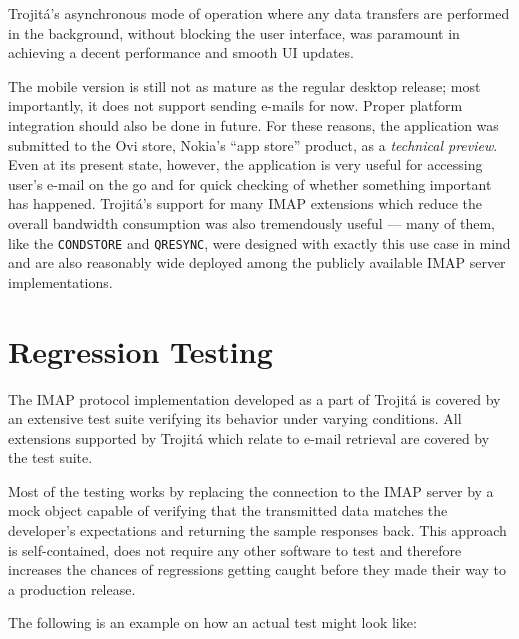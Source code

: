 \documentclass[trojita]{subfiles}
\begin{document}
Trojitá's asynchronous mode of operation where any data transfers are performed in the background, without blocking the
user interface, was paramount in achieving a decent performance and smooth UI updates.

The mobile version is still not as mature as the regular desktop release; most importantly, it does not support sending
e-mails for now.  Proper platform integration should also be done in future.  For these reasons, the application was
submitted to the Ovi store, Nokia's ``app store'' product, as a {\em technical preview}.  Even at its present state,
however, the application is very useful for accessing user's e-mail on the go and for quick checking of whether
something important has happened.  Trojitá's support for many IMAP extensions which reduce the overall bandwidth
consumption was also tremendously useful --- many of them, like the {\tt CONDSTORE} and {\tt QRESYNC}, were designed
with exactly this use case in mind and are also reasonably wide deployed among the publicly available IMAP server
implementations.

\section{Regression Testing}

The IMAP protocol implementation developed as a part of Trojitá is covered by an extensive test suite verifying its
behavior under varying conditions.  All extensions supported by Trojitá which relate to e-mail retrieval are covered by
the test suite.

Most of the testing works by replacing the connection to the IMAP server by a mock object capable of verifying that the
transmitted data matches the developer's expectations and returning the sample responses back.  This approach is
self-contained, does not require any other software to test and therefore increases the chances of regressions getting
caught before they made their way to a production release.

The following is an example on how an actual test might look like:
\end{document}
